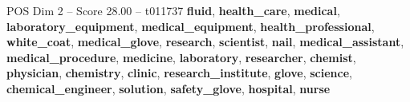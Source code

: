 \begin{textsample}{POS Dim 2 – Score 28.00 – t011737}  \label{ex:f2_pos_034}
\textbf{fluid}, \textbf{health\_care}, \textbf{medical}, \textbf{laboratory\_equipment}, \textbf{medical\_equipment}, \textbf{health\_professional}, \textbf{white\_coat}, \textbf{medical\_glove}, \textbf{research}, \textbf{scientist}, \textbf{nail}, \textbf{medical\_assistant}, \textbf{medical\_procedure}, \textbf{medicine}, \textbf{laboratory}, \textbf{researcher}, \textbf{chemist}, \textbf{physician}, \textbf{chemistry}, \textbf{clinic}, \textbf{research\_institute}, \textbf{glove}, \textbf{science}, \textbf{chemical\_engineer}, \textbf{solution}, \textbf{safety\_glove}, \textbf{hospital}, \textbf{nurse}

\end{textsample}
